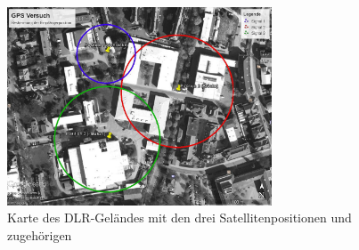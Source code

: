 \documentclass[12pt,a4paper,headinclude,bibtotoc]{scrartcl}
\begin{document}
\begin{figure}[!htb]
	\centering
	\includegraphics[width=0.7\textwidth]{GPS.jpg}
	\caption{Karte des DLR-Geländes mit den drei Satellitenpositionen und zugehörigen}
	\label{fig:gps}
\end{figure}
\end{document}
